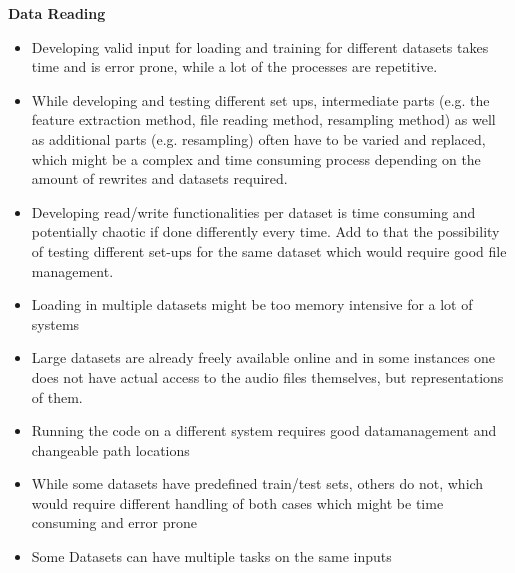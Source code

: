 \textbf{Data Reading}
\begin{itemize}
	\item Developing valid input for loading and training for different datasets takes time and is error prone, while a lot of the processes are repetitive.
	\item While developing and testing different set ups, intermediate parts (e.g. the feature extraction method, file reading method, resampling method) as well as additional parts (e.g. resampling) often have to be varied and replaced, which might be a complex and time consuming process depending on the amount of rewrites and datasets required.
	\item Developing read/write functionalities per dataset is time consuming and potentially chaotic if done differently every time. Add to that the possibility of testing different set-ups for the same dataset which would require good file management. 
	\item Loading in multiple datasets might be too memory intensive for a lot of systems 
	\item Large datasets are already freely available \citep{fonseca2017freesound} \citep{gemmeke2017audio} \citep{piczak2015esc} online and in some instances \citep{paper2021tensorflow} one does not have actual access to the audio files themselves, but representations of them.
	\item Running the code on a different system requires good datamanagement and changeable path locations
	\item While some datasets have predefined train/test sets, others do not, which would require different handling of both cases which might be time consuming and error prone
	\item Some Datasets can have multiple tasks on the same inputs 
\end{itemize}

